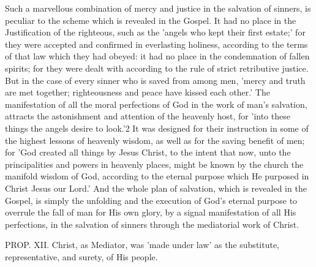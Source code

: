 \documentclass[
]{book}
\begin{document}
Such a marvellous combination of mercy and justice in the salvation of sinners, is peculiar to the scheme which is revealed in the Gospel. It had no place in the Justification of the righteous, such as the 'angels who kept their first estate;' for they were accepted and confirmed in everlasting holiness, according to the terms of that law which they had obeyed: it had no place in the condemnation of fallen spirits; for they were dealt with according to the rule of strict retributive justice. But in the case of every sinner who is saved from among men, 'mercy and truth are met together; righteousness and peace have kissed each other.' The manifestation of all the moral perfections of God in the work of man's salvation, attracts the astonishment and attention of the heavenly host, for 'into these things the angels desire to look.'2 It was designed for their instruction in some of the highest lessons of heavenly wisdom, as well as for the saving benefit of men; for 'God created all things by Jesus Christ, to the intent that now, unto the principalities and powers in heavenly places, might be known by the church the manifold wisdom of God, according to the eternal purpose which He purposed in Christ Jesus our Lord.' And the whole plan of salvation, which is revealed in the Gospel, is simply the unfolding and the execution of God's eternal purpose to overrule the fall of man for His own glory, by a signal manifestation of all His perfections, in the salvation of sinners through the mediatorial work of Christ.

PROP. XII. Christ, as Mediator, was 'made under law' as the substitute, representative, and surety, of His people.
\end{document}
